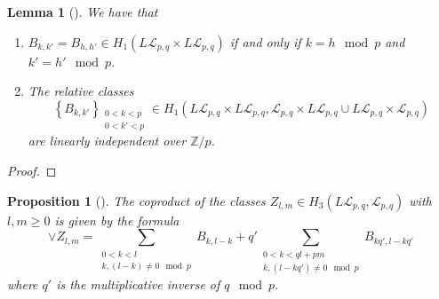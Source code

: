 \documentclass[reqno]{amsart}
\newtheorem{lemma}[theorem]{Lemma}
\newtheorem{proposition}[theorem]{Proposition}
\theoremstyle{definition}
\theoremstyle{remark}
\begin{document}
\begin{lemma}[]\cite[Lemma 2.7]{Naef-Rivera-Wahl}
    We have that
    \begin{enumerate}
        \item $B_{k,k'} = B_{h,h'} \in 
            H_1 \left( L \mathcal{L}_{p,q} \times 
            L \mathcal{L}_{p,q} \right) $ if and only if
            $k = h \mod{p}$ and
            $k' = h' \mod{p}$.
        \item The relative classes
            \[
                \left\{ B_{k,k'} \right\}_{\substack{0 < k < p \\ 0 < k' <p}}
                \in H_1 \left( L \mathcal{L}_{p,q} \times 
                L \mathcal{L}_{p,q}, \mathcal{L}_{p,q}
            \times L \mathcal{L}_{p,q} \cup 
        L \mathcal{L}_{p,q} \times \mathcal{L}_{p,q} \right) 
            \] 
            are linearly independent over $\mathbb{Z}/p$.
    \end{enumerate}
\end{lemma}

\begin{proof}
    \todo{}
\end{proof}


\begin{proposition}[]\cite[Proposition 2.8]{Naef-Rivera-Wahl}
    The coproduct of the classes $Z_{l,m} \in H_3 \left( L \mathcal{L}_{p,q},
    \mathcal{L}_{p,q} \right) $ with $l,m \ge 0$ is given by
    the formula
    \[
    \vee Z_{l,m} = 
    \sum_{\substack{0 < k < l \\ k, (l-k) \neq 0 \mod{p}}}
    B_{k,l-k} + q' 
    \sum_{\substack{0 < k < ql+pm \\ k,(l-kq')\neq 0 \mod{p}}}
    B_{kq', l-kq'}
    \] 
    where $q'$ is the multiplicative inverse of $q \mod{p}$.
\end{proposition}
\end{document}
